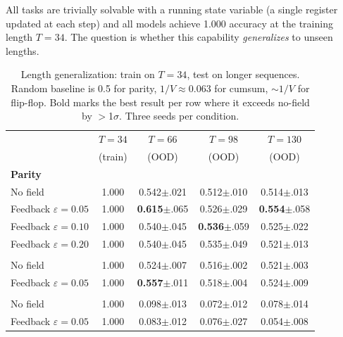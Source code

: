 \documentclass[11pt,a4paper]{article}
\newcommand{\evap}{\varepsilon}
\begin{document}
All tasks are trivially solvable with a running state variable (a
single register updated at each step) and all models achieve 1.000
accuracy at the training length $T = 34$. The question is whether
this capability \emph{generalizes} to unseen lengths.

\begin{table}[h]
\centering
\begin{tabular}{@{}lcccc@{}}
\toprule
& $T = 34$ & $T = 66$ & $T = 98$ & $T = 130$ \\
& (train) & (OOD) & (OOD) & (OOD) \\
\midrule
\multicolumn{5}{l}{\textbf{Parity}} \\
\quad No field       & 1.000 & 0.542{\tiny $\pm$.021} & 0.512{\tiny $\pm$.010} & 0.514{\tiny $\pm$.013} \\
\quad Feedback $\evap\!=\!0.05$ & 1.000 & \textbf{0.615}{\tiny $\pm$.065} & 0.526{\tiny $\pm$.029} & \textbf{0.554}{\tiny $\pm$.058} \\
\quad Feedback $\evap\!=\!0.10$ & 1.000 & 0.540{\tiny $\pm$.045} & \textbf{0.536}{\tiny $\pm$.059} & 0.525{\tiny $\pm$.022} \\
\quad Feedback $\evap\!=\!0.20$ & 1.000 & 0.540{\tiny $\pm$.045} & 0.535{\tiny $\pm$.049} & 0.521{\tiny $\pm$.013} \\
\addlinespace
\multicolumn{5}{l}{\textbf{Flip-flop}} \\
\quad No field       & 1.000 & 0.524{\tiny $\pm$.007} & 0.516{\tiny $\pm$.002} & 0.521{\tiny $\pm$.003} \\
\quad Feedback $\evap\!=\!0.05$ & 1.000 & \textbf{0.557}{\tiny $\pm$.011} & 0.518{\tiny $\pm$.004} & 0.524{\tiny $\pm$.009} \\
\addlinespace
\multicolumn{5}{l}{\textbf{Cumulative sum}} \\
\quad No field       & 1.000 & 0.098{\tiny $\pm$.013} & 0.072{\tiny $\pm$.012} & 0.078{\tiny $\pm$.014} \\
\quad Feedback $\evap\!=\!0.05$ & 1.000 & 0.083{\tiny $\pm$.012} & 0.076{\tiny $\pm$.027} & 0.054{\tiny $\pm$.008} \\
\bottomrule
\end{tabular}
\caption{Length generalization: train on $T=34$, test on longer
sequences. Random baseline is 0.5 for parity, $1/V \approx 0.063$ for
cumsum, $\sim 1/V$ for flip-flop. Bold marks the best result per
row where it exceeds no-field by $>$1$\sigma$. Three seeds per condition.}
\label{tab:lengthgen}
\end{table}
\end{document}
